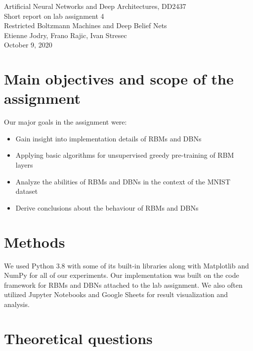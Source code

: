 \documentclass[a4paper]{article}
\begin{document}
\begin{center}
  {\large Artificial Neural Networks and Deep Architectures, DD2437}\\
  \vspace{7mm}
  {\huge Short report on lab assignment 4\\[1ex]}
  {\Large Restricted Boltzmann Machines and Deep Belief Nets}\\
  \vspace{8mm}
  {\Large Etienne Jodry, Frano Rajic, Ivan Stresec\\}
  \vspace{4mm}
  {\large October 9, 2020\\}
\end{center}

\section{Main objectives and scope of the assignment}

Our major goals in the assignment were:
\begin{itemize}
    \item Gain insight into implementation details of RBMs and DBNs
    \item Applying basic algorithms for unsupervised greedy pre-training of RBM layers
    \item Analyze the abilities of RBMs and DBNs in the context of the MNIST dataset
    \item Derive conclusions about the behaviour of RBMs and DBNs
\end{itemize}

\section{Methods}
We used Python 3.8 with some of its built-in libraries along with Matplotlib and NumPy for all of our experiments. Our implementation was built on the code framework for RBMs and DBNs attached to the lab assignment. We also often utilized Jupyter Notebooks and Google Sheets for result visualization and analysis.

\section{Theoretical questions}
\end{document}
